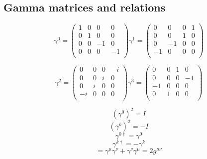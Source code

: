 \subsection{Gamma matrices and relations} %
\label{sub:gamma_matrices_and_relations}

\begin{equation*}
\gamma^{0} = 
\begin{pmatrix} 
	1 	& 	0	&	0	&	0 \\
	0 	& 	1	&	0	&	0 \\
	0 	& 	0	&	-1	&	0 \\
	0 	& 	0	&	0	&	-1 \\
\end{pmatrix}
\gamma^{1} = 
\begin{pmatrix} 
	0 	& 	0	&	0	&	1 \\
	0 	& 	0	&	1	&	0 \\
	0 	& 	-1	&	0	&	0 \\
	-1 	& 	0	&	0	&	0 \\
\end{pmatrix}
\end{equation*}

\begin{equation*}
\gamma^{2} = 
\begin{pmatrix} 
	0 	& 	0	&	0	&	-i \\
	0 	& 	0	&	i	&	0 \\
	0 	& 	i	&	0	&	0 \\
	-i 	& 	0	&	0	&	0 \\
\end{pmatrix}
\gamma^{3} = 
\begin{pmatrix} 
	0 	& 	0	&	1	&	0 \\
	0 	& 	0	&	0	&	-1 \\
	-1 	& 	0	&	0	&	0 \\
	0 	& 	1	&	0	&	0 \\
\end{pmatrix}
\end{equation*}

\begin{equation*}
	(\gamma^{0})^{2} = I
\end{equation*}
\begin{equation*}
	(\gamma^{k})^{2} = -I
\end{equation*}
\begin{equation*}
	\gamma^{0\dagger} = \gamma^{0}
\end{equation*}
\begin{equation*}
	\gamma^{k\dagger} = -\gamma^{k}
\end{equation*}
\begin{equation*}
	[\gamma^{\mu}, \gamma^{\nu}] = \gamma^{\mu}\gamma^{\nu}+\gamma^{\nu}\gamma^{\mu} = 2g^{\mu\nu}
\end{equation*}

